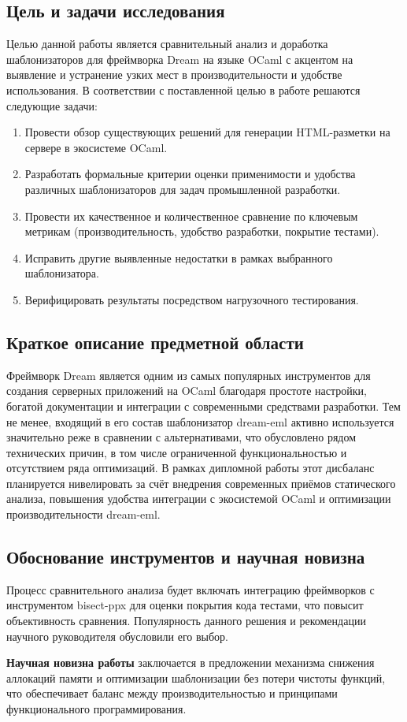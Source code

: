 \subsection*{Цель и задачи исследования} Целью данной работы является сравнительный анализ и доработка шаблонизаторов для фреймворка Dream на языке OCaml с акцентом на выявление и устранение узких мест в производительности и удобстве использования.
В соответствии с поставленной целью в работе решаются следующие задачи:
\begin{enumerate}
    \item Провести обзор существующих решений для генерации HTML-разметки на сервере в экосистеме OCaml.
    \item Разработать формальные критерии оценки применимости и удобства различных шаблонизаторов для задач промышленной разработки.
    \item Провести их качественное и количественное сравнение по ключевым метрикам (производительность, удобство разработки, покрытие тестами).
    \item Исправить другие выявленные недостатки в рамках выбранного шаблонизатора.
    \item Верифицировать результаты посредством нагрузочного тестирования.
\end{enumerate}

\subsection*{Краткое описание предметной области}
Фреймворк Dream является одним из самых популярных инструментов для создания серверных приложений на OCaml благодаря простоте настройки, богатой документации и интеграции с современными средствами разработки.
Тем не менее, входящий в его состав шаблонизатор dream-eml активно используется значительно реже в сравнении с альтернативами, что обусловлено рядом технических причин, в том числе ограниченной функциональностью и отсутствием ряда оптимизаций.
В рамках дипломной работы этот дисбаланс планируется нивелировать за счёт внедрения современных приёмов статического анализа, повышения удобства интеграции с экосистемой OCaml и оптимизации производительности dream-eml.

\subsection*{Обоснование инструментов и научная новизна}
Процесс сравнительного анализа будет включать интеграцию фреймворков с инструментом bisect-ppx для оценки покрытия кода тестами, что повысит объективность сравнения.
Популярность данного решения и рекомендации научного руководителя обусловили его выбор.

\textbf{Научная новизна работы} заключается в предложении механизма снижения аллокаций памяти и оптимизации шаблонизации без потери чистоты функций, что обеспечивает баланс между производительностью и принципами функционального программирования.
